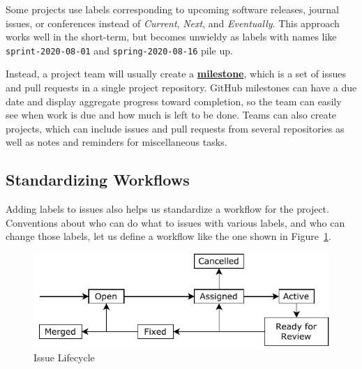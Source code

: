 \documentclass[
]{krantz}
\newcommand{\gref}[2]{\hyperlink{#2}{\textbf{#1}}}
\begin{document}
Some projects use labels corresponding to upcoming software releases, journal issues, or conferences
instead of \emph{Current}, \emph{Next}, and \emph{Eventually}.
This approach works well in the short-term,
but becomes unwieldy as labels with names like \texttt{sprint-2020-08-01} and \texttt{spring-2020-08-16} pile up.

Instead,
a project team will usually create a \gref{milestone}{milestone},
which is a set of issues and pull requests in a single project repository.
GitHub milestones can have a due date
and display aggregate progress toward completion,
so the team can easily see when work is due and how much is left to be done.
Teams can also create projects,
which can include issues and pull requests from several repositories
as well as notes and reminders for miscellaneous tasks.

\hypertarget{teams-workflow}{%
\subsection{Standardizing Workflows}\label{teams-workflow}}

Adding labels to issues also helps us standardize a workflow for the project.
Conventions about who can do what to issues with various labels,
and who can change those labels,
let us define a workflow like the one shown in Figure~\ref{fig:teams-lifecycle}.

\begin{figure}

{\centering \includegraphics[width=1\linewidth]{figures/teams/lifecycle} 

}

\caption{Issue Lifecycle}\label{fig:teams-lifecycle}
\end{figure}
\end{document}

